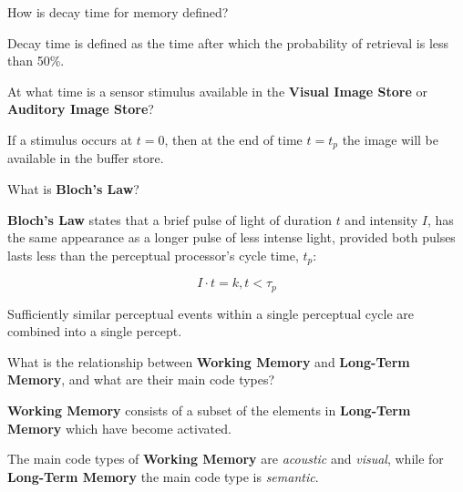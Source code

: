 \begin{flashcard}[Question]{How is decay time for memory defined?}
\begin{center}
Decay time is defined as the time after which the probability of retrieval is less than 50\%.
\end{center}
\end{flashcard}

\begin{flashcard}[Question]{At what time is a sensor stimulus available in the \textbf{Visual Image Store} or \textbf{Auditory Image Store}?}
\begin{center}
If a stimulus occurs at $t = 0$, then at the end of time $t = t_p$ the image will be available in the buffer store.
\end{center}
\end{flashcard}

\begin{flashcard}[Question]{What is \textbf{Bloch's Law}?}
\begin{center}
\textbf{Bloch's Law} states that a brief pulse of light of duration $t$ and intensity $I$, has the same appearance as a longer pulse of less intense light, provided both pulses lasts less than the perceptual processor's cycle time, $t_p$:

\begin{displaymath}
I \cdot t = k, t < \tau_p
\end{displaymath}

\medskip

Sufficiently similar perceptual events within a single perceptual cycle are combined into a single percept.
\end{center}
\end{flashcard}

\begin{flashcard}[Question]{What is the relationship between \textbf{Working Memory} and \textbf{Long-Term Memory}, and what are their main code types?} 
\begin{center}
\textbf{Working Memory} consists of a subset of the elements in \textbf{Long-Term Memory} which have become activated.

\medskip

The main code types of \textbf{Working Memory} are \textit{acoustic} and \textit{visual}, while for \textbf{Long-Term Memory} the main code type is \textit{semantic}.
\end{center}
\end{flashcard}

